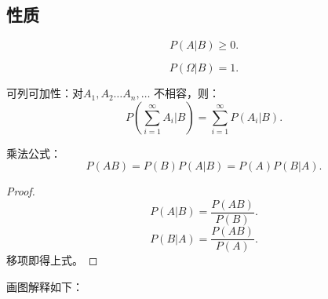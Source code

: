 \subsection{性质}%
\label{sub:条件概率性质}
\begin{rrule}
    \[
        P\left( A|B \right) \ge 0
    .\] 
\end{rrule}
\begin{rrule}
    \[
        P\left( \Omega|B \right) =1
    .\] 
\end{rrule}
\begin{rrule}
    可列可加性：对$A_1,A_2\ldots A_n,\ldots$ 不相容，则：\[
        P\left( \sum_{i=1}^{\infty} A_i | B \right) =\sum_{i=1}^{\infty} P\left( A_i | B \right) 
    .\] 
\end{rrule}
\begin{rrule}
    乘法公式：
    \[
        P\left( AB \right) =P\left( B \right) P\left( A | B \right) =P\left( A \right) P\left( B | A \right) 
    .\] 
    \begin{proof}
        \[
            P\left( A|B \right) =\frac{P\left( AB \right) }{P\left( B \right) }
        .\] 
        \[
            P\left( B|A \right) =\frac{P\left( AB \right) }{P\left( A \right) }
        .\] 
        移项即得上式。
    \end{proof}
\end{rrule}
画图解释如下：
\begin{center}
\end{center}
